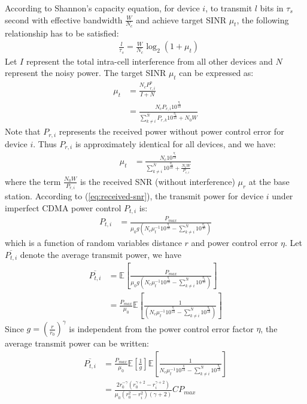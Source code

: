 According to Shannon's capacity equation, for device $i$, to transmit $l$ bits in $\tau_s$ second with effective bandwidth $\frac{W}{N_c}$ and achieve target SINR $\mu_t$, the following relationship has to be satisfied:
\begin{align}
& \frac{l}{\tau_s} = \frac{W}{N_c}\log_2(1+\mu_t)
\end{align}
Let $I$ represent the total intra-cell interference from all other devices and $N$ represent the noisy power. The target SINR $\mu_t$ can be expressed as:
\begin{align}
\mu_t 	& = \frac{N_cP^{p}_{r,i}}{I+N} \nonumber\\
& = \frac{N_cP_{r,i} 10^{\frac{\eta_i}{10}}}{\sum_{ k \neq i}^{\overline{N}}P_{r,k}10^{\frac{\eta_k}{10}}+N_0W} \nonumber
\end{align}
Note that $P_{r,i}$ represents the received power without power control error for device $i$. Thus $P_{r,i}$ is approximately identical for all devices, and we have:
\begin{align}
\mu_t & = \frac{N_c10^{\frac{\eta_i}{10}}}{\sum_{ k \neq i}^{\overline{N}}{10^{\frac{\eta_k}{10}}}+\frac{N_cW}{P_{r,i} }} \nonumber
\end{align}
 where the term $\frac{N_0W}{P_{r,i} }$ is the received SNR (without interference) $\mu_r$ at the base station. According to (\ref{eq:received-snr}), the transmit power for device $i$ under imperfect CDMA power control ${P_{t,i}}$ is:
\begin{align}
P_{t,i} & = \frac{P_{max}}{\mu_0 g( N_{c}\mu_{t}^{-1}10^{\frac{\eta_i}{10}} -\sum_{k \neq i}^{\overline{N}}10^{\frac{\eta_k}{10}})}  \nonumber
\end{align}
which is a function of random variables distance $r$ and power control error $\eta$. Let $\overline{P_{t,i}}$ denote the average transmit power, we have
\begin{align}
\overline{P_{t,i}} & = \mathbb{E}\left[ \frac{P_{max}}{\mu_0 g (N_{c}\mu_{t}^{-1}10^{\frac{\eta_i}{10}} - \sum_{k \neq i}^{\overline{N}}10^{\frac{\eta_k}{10}})}\right] \nonumber\\
& = \frac{P_{max}}{\mu_0}\mathbb{E}\left[ \frac{1}{(N_{c}\mu_{t}^{-1}10^{\frac{\eta_i}{10}} -\sum_{k \neq i}^{\overline{N}}10^{\frac{\eta_k}{10}})}\right] \nonumber
\end{align}
Since $g = \left(\frac{r}{r_0} \right) ^{\gamma}$ is independent from the power control error factor $\eta$, the average transmit power can be written:
\begin{align}
\overline{P_{t,i}} & = \frac{P_{max}}{\mu_0}\mathbb{E}\left[ \frac{1}{g}\right] \mathbb{E}\left[ \frac{1}{ N_{c}\mu_{t}^{-1}10^{\frac{\eta}{10}}-\sum_{k \neq i}^{\overline{N}}10^{\frac{\eta_k}{10}}}\right] \nonumber\\
& = \frac{2r_0^{-\gamma}(r_0^{\gamma+2}-r_i^{\gamma+2})}{\mu_0(r_0^2-r_i^2)(\gamma+2)}CP_{max}  \label{eq:imperfect-CDMA-transmit-power}
\end{align}
